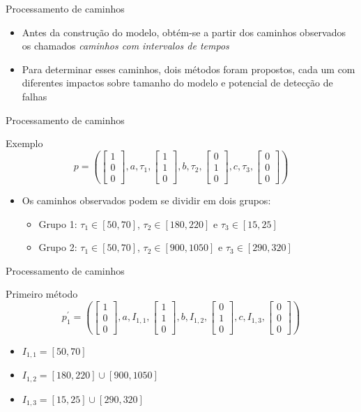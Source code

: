 \documentclass[xcolor=x11names,compress,framenumber]{beamer}
\newcommand{\colvector}[3]{\left[ \begin{array}{c}
		#1 \\ #2 \\ #3
	\end{array}\right]}
\renewcommand{\(}{\begin{columns}}
\renewcommand{\)}{\end{columns}}
\newcommand{\<}[1]{\begin{column}{#1}}
\renewcommand{\>}{\end{column}}
\begin{document}
\begin{frame}{Processamento de caminhos}
	\begin{block}{}
		\begin{itemize}
			\item Antes da construção do modelo, obtém-se a partir dos caminhos observados os chamados \emph{caminhos com intervalos de tempos}
			\item Para determinar esses caminhos, dois métodos foram propostos, cada um com diferentes impactos sobre tamanho do modelo e potencial de detecção de falhas
		\end{itemize}
	\end{block}
\end{frame}

\begin{frame}{Processamento de caminhos}
	\begin{block}{Exemplo}
		\begin{equation*}
		p = \left( \colvector{1}{0}{0},a,\tau_1,\colvector{1}{1}{0},b,\tau_2,\colvector{0}{1}{0},c,\tau_3,\colvector{0}{0}{0}\right)
		\end{equation*}
		\begin{itemize}
			\item Os caminhos observados podem se dividir em dois grupos:
			\begin{itemize}
				\item Grupo 1: $ \tau_1 \in [50,70] $, $ \tau_2 \in [180,220] $ e $ \tau_3 \in [15,25] $
				\item Grupo 2: $ \tau_1 \in [50,70] $, $ \tau_2 \in [900,1050] $ e $ \tau_3 \in [290,320] $
			\end{itemize}
		\end{itemize}
	\end{block}
\end{frame}

\begin{frame}{Processamento de caminhos}
	\begin{block}{Primeiro método}
		\begin{equation*}
		p^\prime_1\! =\! \left( \colvector{1}{0}{0},a,I_{1,1},\colvector{1}{1}{0},b,I_{1,2},\colvector{0}{1}{0},c,I_{1,3},\colvector{0}{0}{0}\right)
		\end{equation*}
		\begin{itemize}
			\item $ I_{1,1} = [50,70] $ 
			\item $ I_{1,2} = [180,220]\cup[900,1050] $ 
			\item $ I_{1,3} = [15,25]\cup[290,320] $
		\end{itemize}
	\end{block}
\end{frame}
\end{document}
